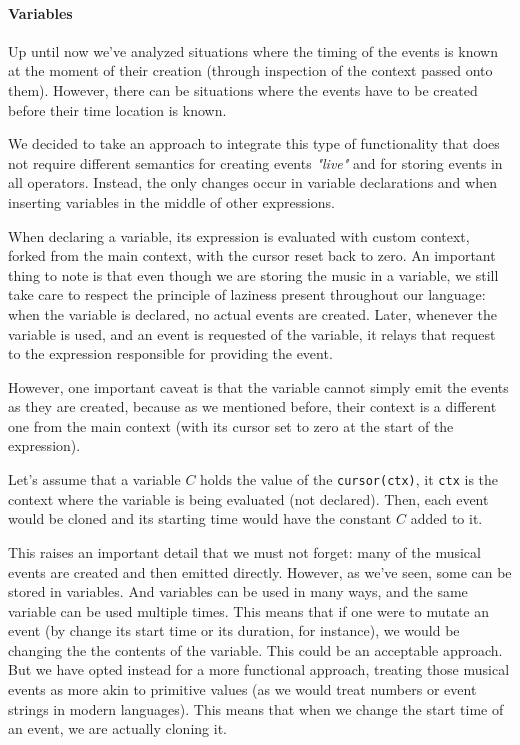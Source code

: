 \documentclass[a4paper,UKenglish,cleveref, autoref]{oasics-v2019}
\begin{document}
\paragraph*{Variables}
Up until now we've analyzed situations where the timing of the events is known at the moment of their creation (through inspection of the context passed onto them). However, there can be situations where the events have to be created before their time location is known.

We decided to take an approach to integrate this type of functionality that does not require different semantics for creating events \textit{"live"} and for storing events in all operators. Instead, the only changes occur in variable declarations and when inserting variables in the middle of other expressions.

When declaring a variable, its expression is evaluated with custom context, forked from the main context, with the cursor reset back to zero. An important thing to note is that even though we are storing the music in a variable, we still take care to respect the principle of laziness present throughout our language: when the variable is declared, no actual events are created. Later, whenever the variable is used, and an event is requested of the variable, it relays that request to the expression responsible for providing the event.

However, one important caveat is that the variable cannot simply emit the events as they are created, because as we mentioned before, their context is a different one from the main context (with its cursor set to zero at the start of the expression).

Let's assume that a variable $C$ holds the value of the \texttt{cursor(ctx)}, it \texttt{ctx} is the context where the variable is being evaluated (not declared). Then, each event would be cloned and its starting time would have the constant $C$ added to it.

This raises an important detail that we must not forget: many of the musical events are created and then emitted directly. However, as we've seen, some can be stored in variables. And variables can be used in many ways, and the same variable can be used multiple times. This means that if one were to mutate an event (by change its start time or its duration, for instance), we would be changing the the contents of the variable. This could be an acceptable approach. But we have opted instead for a more functional approach, treating those musical events as more akin to primitive values (as we would treat numbers or event strings in modern languages). This means that when we change the start time of an event, we are actually cloning it.
\end{document}
